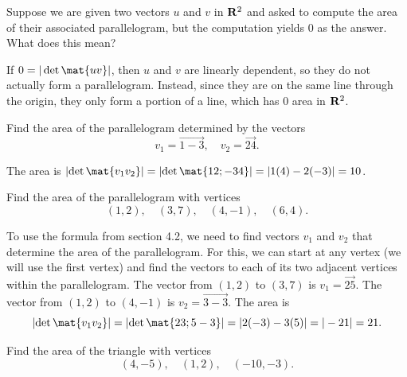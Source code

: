 \begin{problems}
%
\problem %
Suppose we are given two vectors $u$ and $v$ in ${\bf R}^{2}$ and asked to compute
the area of their associated parallelogram, but the computation yields $0$ as the answer.
What does this mean?

\begin{solution}
  If $0 = |\det\mat{u v}|$, then $u$ and $v$ are linearly dependent, so they do
  not actually form a parallelogram.  Instead, since they are on the same line
  through the origin, they only form a portion of a line, which has $0$ area in
  ${\bf R}^{2}$.
\end{solution}

\problem %
  Find the area of the parallelogram determined by the vectors %
  \[v_1 = \vec{1 -3}, \quad v_2 = \vec{2 4}.\]

\begin{solution}
  The area is $\left|\det\mat{v_1 v_2} \right|=
  \left|\det\mat{1 2; -3 4}\right| = \left|1(4)-2(-3)\right| = 10$.
\end{solution}  


\problem %
  Find the area of the parallelogram with vertices
  \[(1, 2), \quad (3, 7), \quad (4, -1),  \quad (6, 4).\]

\begin{solution}
  To use the formula from section 4.2, we need to find vectors $v_1$ and $v_2$
  that determine the area of the parallelogram. For this, we can start at any
  vertex (we will use the first vertex) and find the vectors to each of its two
  adjacent vertices within the parallelogram.  \newline %
  The vector from $(1,2)$ to $(3, 7)$ is $v_1 = \vec{2 5}$. \newline %
  The vector from $(1,2)$ to $(4, -1)$ is $v_2 = \vec{3 -3}$. \newline %
  The area is
  \[\left|\det\mat{v_1 v_2}\right| = \left|\det\mat{2 3; 5 -3}\right| = %
    |2(-3)-3(5)| = |-21| = 21.\]
\end{solution}  


\problem %
  Find the area of the triangle with vertices
  \[(4,-5), \quad (1, 2), \quad (-10, -3).\]


\end{problems}
